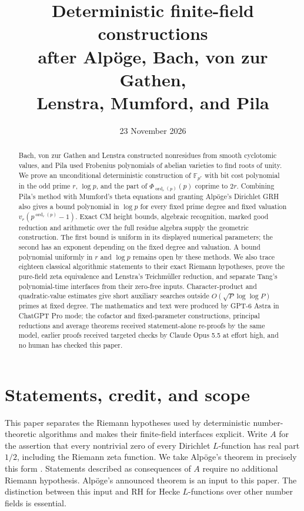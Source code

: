 \documentclass[11pt]{article}
\title{Deterministic finite-field constructions\\
after Alp\"oge, Bach, von zur Gathen,\\
Lenstra, Mumford, and Pila}
\author{}
\date{23 November 2026}
\theoremstyle{definition}
\theoremstyle{remark}
\begin{document}
\maketitle
\begin{abstract}
Bach, von zur Gathen and Lenstra constructed nonresidues from
smooth cyclotomic values, and Pila used Frobenius polynomials of
abelian varieties to find roots of unity. We prove an unconditional
deterministic construction of \(\mathbb F_{p^r}\) with bit cost
polynomial in the odd prime \(r\), \(\log p\), and the part of
\(\Phi_{\operatorname{ord}_r(p)}(p)\) coprime to \(2r\).
Combining Pila's method with Mumford's theta equations and granting
Alp\"oge's Dirichlet GRH also gives a bound polynomial in
\(\log p\) for every fixed prime degree and fixed valuation
\(v_r(p^{\operatorname{ord}_r(p)}-1)\). Exact CM height bounds,
algebraic recognition, marked good reduction and arithmetic over the
full residue algebra supply the geometric construction. The first
bound is uniform in its displayed numerical parameters; the second
has an exponent depending on the fixed degree and valuation. A
bound polynomial uniformly in \(r\) and \(\log p\) remains
open by these methods. We also trace eighteen classical algorithmic
statements to their exact Riemann hypotheses, prove the pure-field
zeta equivalence and Lenstra's Teichm\"uller reduction, and separate
Tang's polynomial-time interfaces from their zero-free inputs.
Character-product and quadratic-value estimates give short auxiliary
searches outside \(O(\sqrt P\log\log P)\) primes at fixed
degree. The mathematics and text were produced by GPT-6 Astra in
ChatGPT Pro mode; the cofactor and fixed-parameter constructions, principal
reductions and average theorems received statement-alone re-proofs
by the same model, earlier proofs received targeted checks by
Claude Opus 5.5 at effort high, and no human has checked this paper.
\end{abstract}

\section{Statements, credit, and scope}
\label{sec:main-statements}
This paper separates the Riemann hypotheses used by deterministic
number-theoretic algorithms and makes their finite-field interfaces explicit.
Write $A$ for the assertion that every nontrivial zero of every Dirichlet
$L$-function has real part $1/2$, including the Riemann zeta function.
We take Alp\"oge's theorem in precisely this form
\citep[p.~1]{Alpoge2026}.  Statements described as consequences of $A$
require no additional Riemann hypothesis.  Alp\"oge's announced theorem
is an input to this paper.  The distinction between this
input and RH for Hecke $L$-functions over other number fields is essential.
\end{document}
